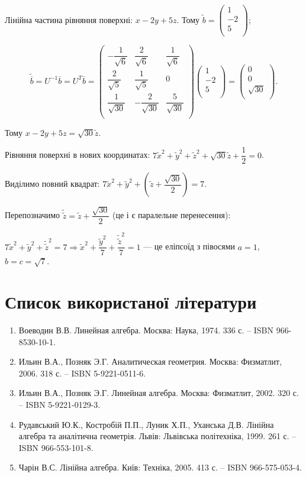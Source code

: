 Лінійна частина рівняння поверхні: $x - 2y +5z$. Тому $\tilde{b} = \begin{pmatrix}
	1 \\
	-2 \\
	5 \\
\end{pmatrix}$;

$$\tilde{\overline{b}} = U^{-1} \overline{b} = U^T \overline{b} = \begin{pmatrix}
	-\dfrac{1}{\sqrt{6}} & \dfrac{2}{\sqrt{6}}   & \dfrac{1}{\sqrt{6}} \\
	\dfrac{2}{\sqrt{5}}  & \dfrac{1}{\sqrt{5}}   & 0 \\
	\dfrac{1}{\sqrt{30}} & -\dfrac{2}{\sqrt{30}} & \dfrac{5}{\sqrt{30}} \\
\end{pmatrix} \begin{pmatrix}
	1 \\
	-2 \\
	5 \\
\end{pmatrix} = \begin{pmatrix}
	0 \\
	0 \\
	\sqrt{30} \\
\end{pmatrix}.$$

Тому $x - 2y + 5z = \sqrt{30}\tilde{z}$.

Рівняння поверхні в нових координатах: $7\tilde{x}^2 + \tilde{y}^2 + \tilde{z}^2 + \sqrt{30} \tilde{z} + \dfrac{1}{2} = 0$.

Виділимо повний квадрат: $7\tilde{x}^2 + \tilde{y}^2 + \left( \tilde{z} + \dfrac{\sqrt{30}}{2} \right) = 7$.

Перепозначимо $\tilde{\tilde{z}} = \tilde{z} + \dfrac{\sqrt{30}}{2}$ (це і є паралельне перенесення): 

$7\tilde{x}^2 + \tilde{y}^2 + \tilde{\tilde{z}}^2
= 7 \Rightarrow \tilde{x}^2 + \dfrac{\tilde{y}^2}{7} + \dfrac{\tilde{\tilde{z}}^2}{7} = 1$
--- це еліпсоїд з півосями $a = 1$, $b = c = \sqrt{7}$.


\section{Список використаної літератури}


\begin{enumerate}
	\item Воеводин В.В. Линейная алгебра. Москва: Наука, 1974. 336 с. – ISBN 966-8530-10-1.
	\item Ильин В.А., Позняк Э.Г. Аналитическая геометрия. Москва: Физматлит, 2006. 318 с. – ISBN 5-9221-0511-6.
	\item Ильин В.А., Позняк Э.Г. Линейная алгебра. Москва: Физматлит, 2002. 320 с. – ISBN 5-9221-0129-3.
	\item Рудавський Ю.К., Костробій П.П., Луник Х.П., Уханська Д.В. Лінійна алгебра та аналітична геометрія. Львів: Львівська політехніка, 1999. 261 с. – ISBN 966-553-101-8.
	\item Чарін В.С. Лінійна алгебра. Київ: Техніка, 2005. 413 с. – ISBN 966-575-053-4. 
\end{enumerate}




